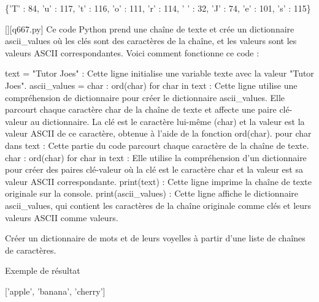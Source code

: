 \{'T' : 84, 'u' : 117, 't' : 116, 'o' : 111, 'r' : 114, ' ' : 32, 'J' : 74, 'e' : 101, 's' : 115\}
        \par
        \begin{solution}
            \renewcommand{\nomfichier}{q667.py}
            \pythonfile{\chemincode \nomfichier}[][\nomfichier]
            Ce code Python prend une chaîne de texte et crée un dictionnaire ascii_values où les clés sont des caractères de la chaîne, et les valeurs sont les valeurs ASCII correspondantes. Voici comment fonctionne ce code :

    text = "Tutor Joes" : Cette ligne initialise une variable texte avec la valeur "Tutor Joes".
    ascii_values = {char : ord(char) for char in text} : Cette ligne utilise une compréhension de dictionnaire pour créer le dictionnaire ascii_values. Elle parcourt chaque caractère char de la chaîne de texte et affecte une paire clé-valeur au dictionnaire. La clé est le caractère lui-même (char) et la valeur est la valeur ASCII de ce caractère, obtenue à l'aide de la fonction ord(char).
        pour char dans text : Cette partie du code parcourt chaque caractère de la chaîne de texte.
        {char : ord(char) for char in text} : Elle utilise la compréhension d'un dictionnaire pour créer des paires clé-valeur où la clé est le caractère char et la valeur est sa valeur ASCII correspondante.
    print(text) : Cette ligne imprime la chaîne de texte originale sur la console.
    print(ascii_values) : Cette ligne affiche le dictionnaire ascii_values, qui contient les caractères de la chaîne originale comme clés et leurs valeurs ASCII comme valeurs.
        \end{solution}
        

        \question
        Créer un dictionnaire de mots et de leurs voyelles à partir d'une liste de chaînes de caractères.

Exemple de résultat

['apple', 'banana', 'cherry']

